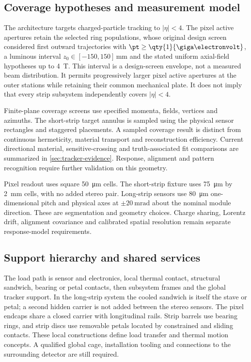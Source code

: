 \subsection{Coverage hypotheses and measurement model}
The architecture targets charged-particle tracking to $|\eta|<4$. The pixel
active apertures retain the selected ring populations, whose original design
screen considered first outward trajectories with
$\pt\geq\qty{1}{\giga\electronvolt}$, a luminous interval
$z_0\in[-150,150]\,\unit{\milli\metre}$ and the stated uniform axial-field
hypotheses up to \qty{4}{\tesla}. This interval is a design-screen envelope,
not a measured beam distribution. It permits progressively larger pixel active
apertures at the outer stations while retaining their common mechanical plate.
It does not imply that every strip subsystem independently covers $|\eta|<4$.

Finite-plane coverage screens use specified momenta, fields, vertices and
azimuths. The short-strip target annulus is sampled using the physical sensor
rectangles and staggered placements. A sampled coverage result is distinct
from continuous hermeticity, material transport and reconstruction efficiency.
Current directional material, sensitive-crossing and truth-associated fit
comparisons are summarized in \cref{sec:tracker-evidence}. Response, alignment
and pattern recognition require further validation on this geometry.

Pixel readout uses square \qty{50}{\micro\metre} cells. The short-strip fixture
uses \qty{75}{\micro\metre} by \qty{2}{\milli\metre} cells, with no added
stereo pair. Long-strip sensors use \qty{80}{\micro\metre} one-dimensional
pitch and physical axes at $\pm\qty{20}{\milli\radian}$ about the nominal
module direction. These are segmentation and geometry choices. Charge sharing,
Lorentz drift, alignment covariance and calibrated spatial resolution remain
separate response-model requirements.

\subsection{Support hierarchy and shared services}
The load path is sensor and electronics, local thermal contact, structural
sandwich, bearing or petal contacts, then subsystem frames and the global tracker
support. In the long-strip system the cooled sandwich is itself the stave or
petal; a second hidden carrier is not added between the stereo sensors. The
pixel endcaps share a closed carrier with longitudinal rails. Strip barrels use
bearing rings, and strip discs use removable petals located by constrained and
sliding contacts. These local constructions define load transfer and thermal
motion concepts. A qualified global cage, installation tooling and connections
to the surrounding detector are still required.

